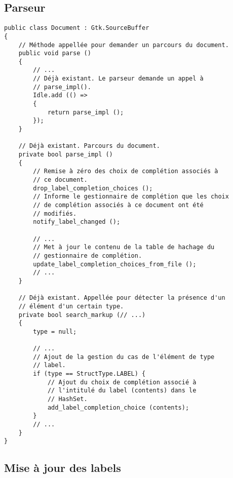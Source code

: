 \documentclass[a4paper,11pt]{report}
\begin{document}
\subsection{Parseur}
\label{ssec:parseur}

\begin{lstlisting}[frame=single]
public class Document : Gtk.SourceBuffer
{
    // Méthode appellée pour demander un parcours du document.
    public void parse ()
    {
        // ...
        // Déjà existant. Le parseur demande un appel à
        // parse_impl().
        Idle.add (() =>
        {
            return parse_impl ();
        });
    }
    
    // Déjà existant. Parcours du document.
    private bool parse_impl ()
    {
        // Remise à zéro des choix de complétion associés à
        // ce document.
        drop_label_completion_choices ();
        // Informe le gestionnaire de complétion que les choix
        // de complétion associés à ce document ont été
        // modifiés.
        notify_label_changed ();
        
        // ...
        // Met à jour le contenu de la table de hachage du
        // gestionnaire de complétion.
        update_label_completion_choices_from_file ();
        // ...
    }
    
    // Déjà existant. Appellée pour détecter la présence d'un
    // élément d'un certain type.
    private bool search_markup (// ...)
    {
        type = null;
        
        // ...
        // Ajout de la gestion du cas de l'élément de type
        // label.
        if (type == StructType.LABEL) {
            // Ajout du choix de complétion associé à
            // l'intitulé du label (contents) dans le
            // HashSet.
            add_label_completion_choice (contents);
        }
        // ...
    }
}
\end{lstlisting}

\subsection{Mise à jour des labels}
\label{ssec:maj_des_labels}
\end{document}
